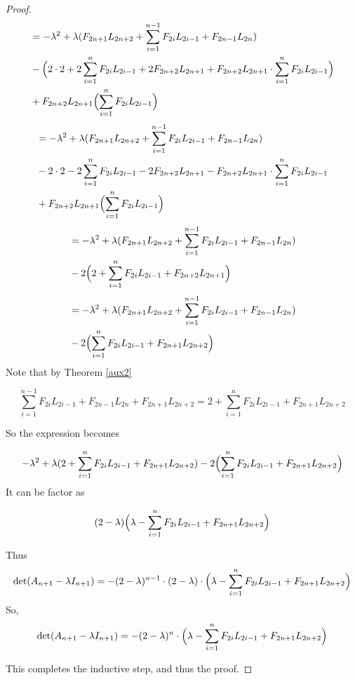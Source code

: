 \documentclass[10pt,a4paper]{amsart}
\begin{document}
\begin{proof}
\begin{align*}
&=-\lambda^2+\lambda(F_{2n+1}L_{2n+2}+\sum_{i=1}^{n-1}F_{2i}L_{2i-1}+F_{2n-1}L_{2n})\\
&-\Bigl(2\cdot2+2\sum_{i=1}^{n}F_{2i}L_{2i-1}+2F_{2n+2}L_{2n+1}+F_{2n+2}L_{2n+1}\cdot\sum_{i=1}^{n}F_{2i}L_{2i-1}\Bigr)\\
&+F_{2n+2}L_{2n+1}\Bigl(\sum_{i=1}^{n}F_{2i}L_{2i-1}\Bigr)
\end{align*}
\begin{align*}
&=-\lambda^2+\lambda(F_{2n+1}L_{2n+2}+\sum_{i=1}^{n-1}F_{2i}L_{2i-1}+F_{2n-1}L_{2n})\\
&-2\cdot2-2\sum_{i=1}^{n}F_{2i}L_{2i-1}-2F_{2n+2}L_{2n+1}-F_{2n+2}L_{2n+1}\cdot\sum_{i=1}^{n}F_{2i}L_{2i-1}\\
&+F_{2n+2}L_{2n+1}\Bigl(\sum_{i=1}^{n}F_{2i}L_{2i-1}\Bigr)
\end{align*}
\begin{align*}
&=-\lambda^2+\lambda(F_{2n+1}L_{2n+2}+\sum_{i=1}^{n-1}F_{2i}L_{2i-1}+F_{2n-1}L_{2n})\\
&-2\Bigl( 2+\sum_{i=1}^{n}F_{2i}L_{2i-1}+F_{2n+2}L_{2n+1}\Bigr)
\end{align*}
\begin{align*}
&=-\lambda^2+\lambda(F_{2n+1}L_{2n+2}+\sum_{i=1}^{n-1}F_{2i}L_{2i-1}+F_{2n-1}L_{2n})\\
&-2\Bigl( \sum_{i=1}^{n}F_{2i}L_{2i-1}+F_{2n+1}L_{2n+2}\Bigr)
\end{align*}
\noindent Note that by Theorem \ref{aux2} 

\[\sum_{i=1}^{n-1}F_{2i}L_{2i-1}+F_{2n-1}L_{2n}+F_{2n+1}L_{2n+2}=2+\sum_{i=1}^{n}F_{2i}L_{2i-1}+F_{2n+1}L_{2n+2}\]

\noindent So the expression becomes

\[-\lambda^2+\lambda(2+\sum_{i=1}^{n}F_{2i}L_{2i-1}+F_{2n+1}L_{2n+2})\\
-2\Bigl( \sum_{i=1}^{n}F_{2i}L_{2i-1}+F_{2n+1}L_{2n+2}\Bigr)\]
\noindent It can be factor as

\[(2-\lambda)\Bigl( \lambda - \sum_{i=1}^{n} F_{2i}L_{2i-1}+F_{2n+1}L_{2n+2} \Bigr)\]

\noindent Thus 
\[\operatorname{det}(A_{n+1}-\lambda I_{n+1})=-(2-\lambda)^{n-1}\cdot(2-\lambda)\cdot\Bigl( \lambda - \sum_{i=1}^{n} F_{2i}L_{2i-1}+F_{2n+1}L_{2n+2} \Bigr)\]
So, 
\[\operatorname{det}(A_{n+1}-\lambda I_{n+1})=-(2-\lambda)^{n}\cdot\Bigl( \lambda - \sum_{i=1}^{n} F_{2i}L_{2i-1}+F_{2n+1}L_{2n+2} \Bigr)\]

\noindent This completes the inductive step, and thus the proof.
\end{proof}
\end{document}
